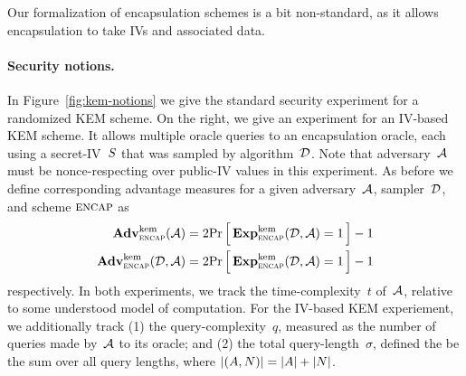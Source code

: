 Our formalization of encapsulation schemes is a bit non-standard, as it allows encapsulation to take IVs and associated data.

\paragraph{Security notions. }  In Figure~\ref{fig:kem-notions} we give the standard security experiment for a randomized KEM scheme.  On the right, we give an experiment for an IV-based KEM scheme.  It allows multiple oracle queries to an encapsulation oracle, each using a secret-IV~$S$ that was sampled by algorithm~${\cal D}$.  Note that adversary~${\cal A}$ must be nonce-respecting over public-IV values in this experiment.
As before we define corresponding advantage measures for a given adversary~${\cal A}$, sampler~${\cal D}$, and scheme $\textsc{encap}$ as
\begin{align*}
\mathbf{Adv}^{\mathrm{kem}}_{\textsc{encap}}{({\cal A})}&=2{\Pr\left[\,{\mathbf{Exp}^{\mathrm{kem}}_{\textsc{encap}}{({\cal D},{\cal A})}=1}\,\right]}-1\\ \mathbf{Adv}^{\mathrm{kem}}_{\textsc{encap}}{({\cal D},{\cal A})}&=2{\Pr\left[\,{\mathbf{Exp}^{\mathrm{kem}}_{\textsc{encap}}{({\cal D},{\cal A})}=1}\,\right]}-1
\end{align*}
respectively.  In both experiments, we track the time-complexity~$t$ of~${\cal A}$, relative to some understood model of computation.  For the IV-based KEM experiement, we additionally track (1) the query-complexity~$q$, measured as the number of queries made by~${\cal A}$ to its oracle; and (2) the total query-length~$\sigma$, defined the be the sum over all query lengths, where $|(A,N)|=|A|+|N|$.


